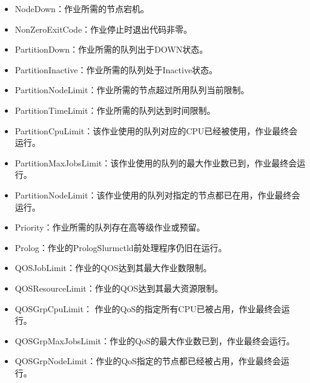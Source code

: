 \documentclass[a4paper,12pt,english]{sphinxmanual}
\begin{document}
\begin{itemize}
\begin{itemize}
\item {} 
\sphinxAtStartPar
NodeDown：作业所需的节点宕机。

\item {} 
\sphinxAtStartPar
NonZeroExitCode：作业停止时退出代码非零。

\item {} 
\sphinxAtStartPar
PartitionDown：作业所需的队列出于DOWN状态。

\item {} 
\sphinxAtStartPar
PartitionInactive：作业所需的队列处于Inactive状态。

\item {} 
\sphinxAtStartPar
PartitionNodeLimit：作业所需的节点超过所用队列当前限制。

\item {} 
\sphinxAtStartPar
PartitionTimeLimit：作业所需的队列达到时间限制。

\item {} 
\sphinxAtStartPar
PartitionCpuLimit：该作业使用的队列对应的CPU已经被使用，作业最终会运行。

\item {} 
\sphinxAtStartPar
PartitionMaxJobsLimit：该作业使用的队列的最大作业数已到，作业最终会运行。

\item {} 
\sphinxAtStartPar
PartitionNodeLimit：该作业使用的队列对指定的节点都已在用，作业最终会运行。

\item {} 
\sphinxAtStartPar
Priority：作业所需的队列存在高等级作业或预留。

\item {} 
\sphinxAtStartPar
Prolog：作业的PrologSlurmctld前处理程序仍旧在运行。

\item {} 
\sphinxAtStartPar
QOSJobLimit：作业的QOS达到其最大作业数限制。

\item {} 
\sphinxAtStartPar
QOSResourceLimit：作业的QOS达到其最大资源限制。

\item {} 
\sphinxAtStartPar
QOSGrpCpuLimit： 作业的QoS的指定所有CPU已被占用，作业最终会运行。

\item {} 
\sphinxAtStartPar
QOSGrpMaxJobsLimit：作业的QoS的最大作业数已到，作业最终会运行。

\item {} 
\sphinxAtStartPar
QOSGrpNodeLimit：作业的QoS指定的节点都已经被占用，作业最终会运行。


\end{itemize}
\end{itemize}
\end{document}
